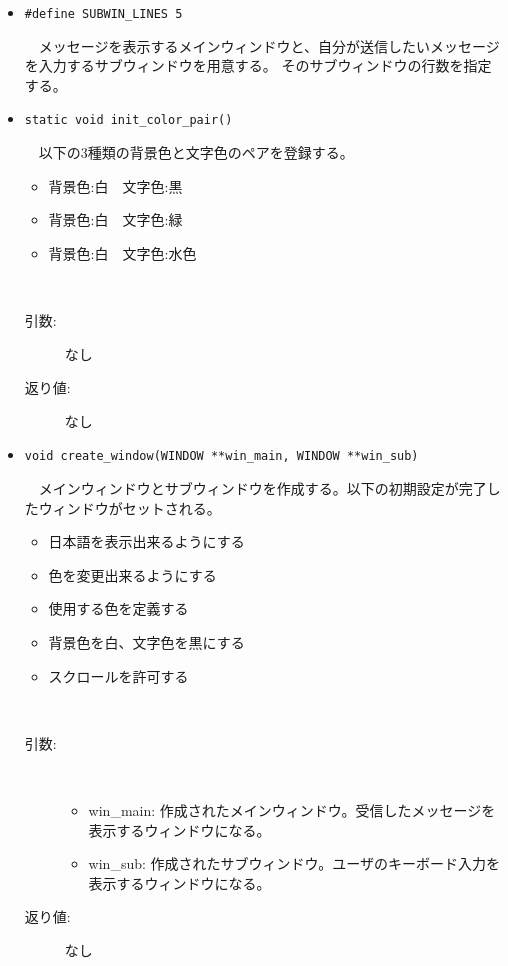 \documentclass[uplatex,dvipdfmx,11pt,a4paper]{jsarticle} %
\begin{document}
\begin{itemize}
    \item {\tt \#define SUBWIN\_LINES 5}

        　メッセージを表示するメインウィンドウと、自分が送信したいメッセージを入力するサブウィンドウを用意する。
        そのサブウィンドウの行数を指定する。
        \newline
    \item {\tt static void init\_color\_pair()}

        　以下の3種類の背景色と文字色のペアを登録する。
        \begin{itemize}
            \item 背景色:白　文字色:黒
            \item 背景色:白　文字色:緑
            \item 背景色:白　文字色:水色
        \end{itemize}
      　\begin{description}
            \item[引数:] なし
            \item[返り値:] なし
            \newline
      　\end{description}

    \item {\tt void create\_window(WINDOW **win\_main, WINDOW **win\_sub)}

        　メインウィンドウとサブウィンドウを作成する。以下の初期設定が完了したウィンドウがセットされる。
        \begin{itemize}
            \item 日本語を表示出来るようにする
            \item 色を変更出来るようにする
            \item 使用する色を定義する
            \item 背景色を白、文字色を黒にする
            \item スクロールを許可する
        \end{itemize}
        　\begin{description}
            \item[引数:] \ 

                \begin{itemize}
                    \item win\_main: 作成されたメインウィンドウ。受信したメッセージを表示するウィンドウになる。
                    \item win\_sub: 作成されたサブウィンドウ。ユーザのキーボード入力を表示するウィンドウになる。
                \end{itemize}
            \item[返り値:] なし
        　\end{description}
\end{itemize}
\end{document}
